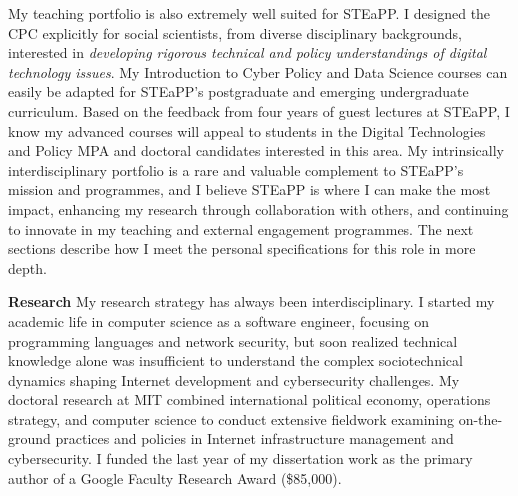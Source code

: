 \documentclass[11pt]{letter}
\begin{document}
\begin{letter}
My teaching portfolio is also extremely well suited for STEaPP.
%
%
I designed the CPC explicitly for social scientists, from diverse disciplinary backgrounds, interested in \emph{developing rigorous technical and policy understandings of digital technology issues}.
%
My Introduction to Cyber Policy and Data Science courses can easily be adapted for STEaPP's postgraduate and emerging undergraduate curriculum.
%
Based on the feedback from four years of guest lectures at STEaPP, I know my advanced courses will appeal to students in the Digital Technologies and Policy MPA and doctoral candidates interested in this area.
%
%
My intrinsically interdisciplinary portfolio is a rare and valuable complement to STEaPP's mission and programmes, and I believe STEaPP is where I can make the most impact, enhancing my research through collaboration with others, and continuing to innovate in my teaching and external engagement programmes.
%
The next sections describe how I meet the personal specifications for this role in more depth. 




\textbf{Research} \vspace{0.2 \baselineskip} \newline %
%
My research strategy has always been interdisciplinary. 
%
I started my academic life in computer science as a software engineer, focusing on programming languages and network security, but soon realized technical knowledge alone was insufficient to understand the complex sociotechnical dynamics shaping Internet development and cybersecurity challenges.
My doctoral research at MIT combined international political economy, operations strategy, and computer science to conduct extensive fieldwork examining on-the-ground practices and policies in Internet infrastructure management and cybersecurity.
%
I funded the last year of my dissertation work as the primary author of a Google Faculty Research Award (\$85,000). 
%


\end{letter}
\end{document}
